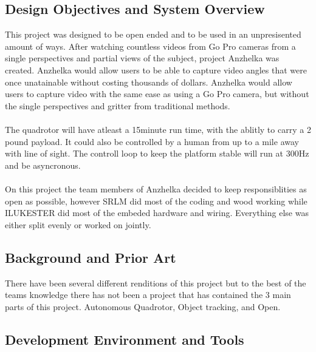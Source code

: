 \documentclass{article}
\numberwithin{equation}{section} %
\begin{document}
\subsection{Design Objectives and System Overview}

This project was designed to be open ended and to be used in an unpresisented amount of ways. After watching countless videos from Go Pro cameras from a single perspectives and partial views of the subject, project Anzhelka was created. Anzhelka would allow users to be able to capture video angles that were once unatainable without costing thousands of dollars. Anzhelka would allow users to capture video with the same ease as using a Go Pro camera, but without the single perspectives and gritter from traditional methods.\\ \\
The quadrotor will have atleast a 15minute run time, with the ablitly to carry a 2 pound payload. It could also be controlled by a human from up to a mile away with line of sight. The controll loop to keep the platform stable will run at 300Hz and be asyncronous. \\ \\
On this project the team members of Anzhelka decided to keep responsiblities as open as possible, however SRLM did most of the coding and wood working while ILUKESTER did most of the embeded hardware and wiring. Everything else was either split evenly or worked on jointly.

\subsection{Background and Prior Art}

There have been several different renditions of this project but to the best of the teams knowledge there has not been a project that has contained the 3 main parts of this project. Autonomous Quadrotor, Object tracking, and Open.

\subsection{Development Environment and Tools}
\end{document}
